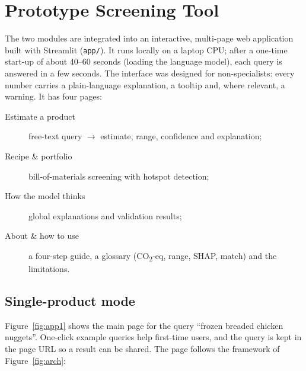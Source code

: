 \chapter{Prototype Screening Tool}
\label{ch:tool}

The two modules are integrated into an interactive, multi-page web application built with
Streamlit (\texttt{app/}). It runs locally on a laptop CPU; after a one-time start-up of about
40--60 seconds (loading the language model), each query is answered in a few seconds. The
interface was designed for non-specialists: every number carries a plain-language explanation,
a tooltip and, where relevant, a warning. It has four pages:

\begin{description}
  \item[Estimate a product] free-text query $\rightarrow$ estimate, range, confidence and explanation;
  \item[Recipe \& portfolio] bill-of-materials screening with hotspot detection;
  \item[How the model thinks] global explanations and validation results;
  \item[About \& how to use] a four-step guide, a glossary (CO\textsubscript{2}-eq, range, SHAP,
  match) and the limitations.
\end{description}

\section{Single-product mode}

Figure~\ref{fig:app1} shows the main page for the query ``frozen breaded chicken nuggets''. One-click
example queries help first-time users, and the query is kept in the page URL so a result can be
shared. The page follows the framework of Figure~\ref{fig:arch}:

